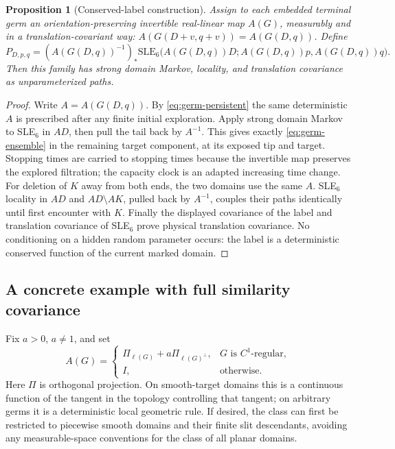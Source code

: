 \documentclass[11pt]{article}
\newtheorem{proposition}[theorem]{Proposition}
\theoremstyle{definition}\newtheorem{definition}[theorem]{Definition}
\theoremstyle{remark}\newtheorem{remark}[theorem]{Remark}
\newcommand{\SLE}{\mathrm{SLE}_6}
\begin{document}
\begin{proposition}[Conserved-label construction]
\label{prop:germ-construction}
Assign to each embedded terminal germ an orientation-preserving invertible
real-linear map $A(G)$, measurably and in a translation-covariant way:
$A(G(D+v,q+v))=A(G(D,q))$. Define
\begin{equation}
 P_{D,p,q}=(A(G(D,q))^{-1})_*
       \SLE\bigl(A(G(D,q))D;A(G(D,q))p,A(G(D,q))q\bigr).
 \label{eq:germ-ensemble}
\end{equation}
Then this family has strong domain Markov, locality, and translation
covariance as unparameterized paths.
\end{proposition}

\begin{proof}
Write $A=A(G(D,q))$. By \eqref{eq:germ-persistent} the same deterministic
$A$ is prescribed after any finite initial exploration. Apply strong
domain Markov to SLE$_6$ in $AD$, then pull the tail back by $A^{-1}$.
This gives exactly \eqref{eq:germ-ensemble} in the remaining target
component, at its exposed tip and target. Stopping times are carried
to stopping times because the invertible map preserves the explored
filtration; the capacity clock is an adapted increasing time change.
For deletion of $K$ away from both ends, the two domains use the same
$A$. SLE$_6$ locality in $AD$ and $AD\setminus AK$, pulled back by
$A^{-1}$, couples their paths identically until first encounter with $K$.
Finally the displayed covariance of the label and translation covariance
of SLE$_6$ prove physical translation covariance. No conditioning on a
hidden random parameter occurs: the label is a deterministic conserved
function of the current marked domain.
\end{proof}

\subsection{A concrete example with full similarity covariance}

Fix $a>0$, $a\ne1$, and set
\begin{equation}
 A(G)=\begin{cases}
 \Pi_{\ell(G)}+a\Pi_{\ell(G)^\perp},&G\text{ is }C^1\text{-regular},\\
 I,&\text{otherwise}.
 \end{cases}
 \label{eq:tangent-label}
\end{equation}
Here $\Pi$ is orthogonal projection. On smooth-target domains this is a
continuous function of the tangent in the topology controlling that
tangent; on arbitrary germs it is a deterministic local geometric rule.
If desired, the class can first be restricted to piecewise smooth
domains and their finite slit descendants, avoiding any measurable-space
conventions for the class of all planar domains.
\end{document}
